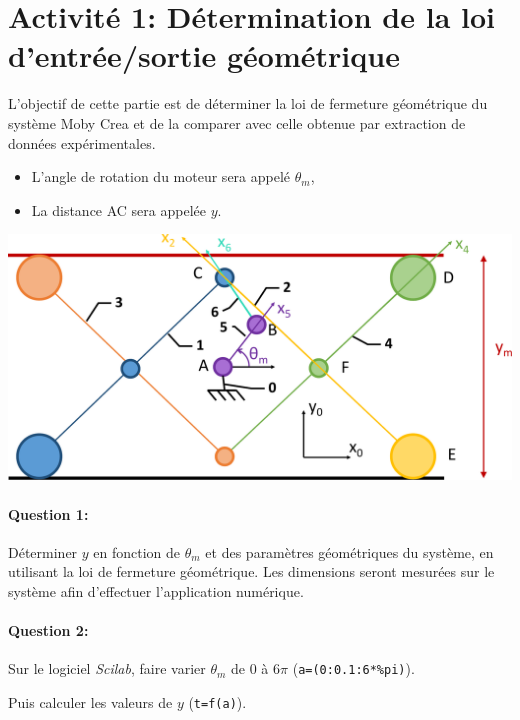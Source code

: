 

\section{Activité 1: Détermination de la loi d'entrée/sortie géométrique}

L'objectif de cette partie est de déterminer la loi de fermeture géométrique du système Moby Crea et de la comparer avec celle obtenue par extraction de données expérimentales.

\begin{itemize}
 \item L'angle de rotation du moteur sera appelé $\theta_m$,
 \item La distance AC sera appelée $y$.
\end{itemize}

\begin{center}
 \includegraphics[width=0.6\linewidth]{img/moby_cin}
\end{center}

\paragraph{Question 1:} Déterminer $y$ en fonction de $\theta_m$ et des paramètres géométriques du système, en utilisant la loi de fermeture géométrique. Les dimensions seront mesurées sur le système afin d'effectuer l'application numérique.

\paragraph{Question 2:} Sur le logiciel \textit{Scilab}, faire varier $\theta_m$ de $0$ à $6\pi$ (\texttt{a=(0:0.1:6*\%pi)}).

Puis calculer les valeurs de $y$ (\texttt{t=f(a)}).

